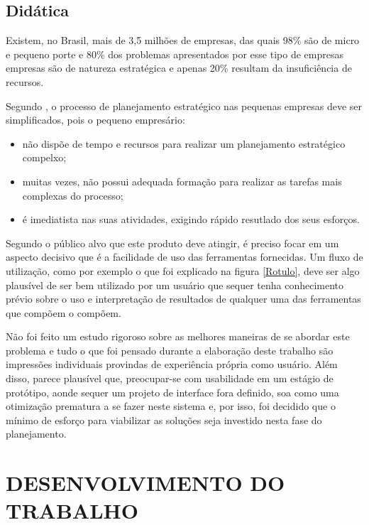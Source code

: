 \documentclass{abnt}
\begin{document}

\section{Didática}

Existem, no Brasil, mais de 3,5 milhões de empresas, das quais 98\% são de
micro e pequeno porte e 80\% dos problemas apresentados por esse tipo de
empresas empresas são de natureza estratégica e apenas 20\% resultam da
insuficiência de recursos.\cite{anaTerence} 

Segundo \cite{almeida1994desenvolvimento}, o processo de planejamento
estratégico nas pequenas empresas deve ser simplificados, pois o pequeno
empresário:

\begin{itemize}
	\item não dispõe de tempo e recursos para realizar um planejamento estratégico
	compelxo;
	\item muitas vezes, não possui adequada formação para realizar as tarefas mais
	complexas do processo;
	\item é imediatista nas suas atividades, exigindo rápido resutlado dos seus
	esforços.
\end{itemize}

Segundo o público alvo que este produto deve atingir, é preciso focar em um
aspecto decisivo que é a facilidade de uso das ferramentas fornecidas. Um fluxo
de utilização, como por exemplo o que foi explicado na figura \ref{Rotulo}, deve
ser algo plausível de ser bem utilizado por um usuário que sequer tenha
conhecimento prévio sobre o uso e interpretação de resultados de qualquer uma
das ferramentas que compõem o compõem.

Não foi feito um estudo rigoroso sobre as melhores maneiras de se abordar este
problema e tudo o que foi pensado durante a elaboração deste trabalho são
impressões individuais provindas de experiência própria como usuário. Além
disso, parece plausível que, preocupar-se com usabilidade em um estágio de
protótipo, aonde sequer um projeto de interface fora definido, soa como uma
otimização prematura a se fazer neste sistema e, por isso, foi decidido que o
mínimo de esforço para viabilizar as soluções seja investido nesta fase do
planejamento.

\chapter{DESENVOLVIMENTO DO TRABALHO}
\end{document}
